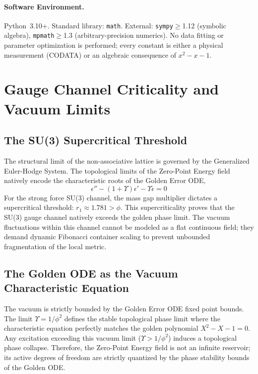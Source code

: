 \paragraph{Software Environment.}
Python~3.10+. Standard library: \texttt{math}. External: \texttt{sympy}$\geq$1.12 (symbolic algebra), \texttt{mpmath}$\geq$1.3 (arbitrary-precision numerics). No data fitting or parameter optimization is performed; every constant is either a physical measurement (CODATA) or an algebraic consequence of $x^2 - x - 1$.

\section{Gauge Channel Criticality and Vacuum Limits}

\subsection{The SU(3) Supercritical Threshold}
The structural limit of the non-associative lattice is governed by the Generalized Euler-Hodge System. The topological limits of the Zero-Point Energy field natively encode the characteristic roots of the Golden Error ODE, 
\begin{equation}
    \epsilon'' - (1+\Upsilon)\epsilon' - \Upsilon\epsilon = 0
\end{equation}
For the strong force SU(3) channel, the mass gap multiplier dictates a supercritical threshold: $r_1 \approx 1.781 > \phi$. This supercriticality proves that the SU(3) gauge channel natively exceeds the golden phase limit. The vacuum fluctuations within this channel cannot be modeled as a flat continuous field; they demand dynamic Fibonacci container scaling to prevent unbounded fragmentation of the local metric.

\subsection{The Golden ODE as the Vacuum Characteristic Equation}
The vacuum is strictly bounded by the Golden Error ODE fixed point bounds. The limit $\Upsilon = 1/\phi^2$ defines the stable topological phase limit where the characteristic equation perfectly matches the golden polynomial $X^2 - X - 1 = 0$. Any excitation exceeding this vacuum limit ($\Upsilon > 1/\phi^2$) induces a topological phase collapse. Therefore, the Zero-Point Energy field is not an infinite reservoir; its active degrees of freedom are strictly quantized by the phase stability bounds of the Golden ODE.

